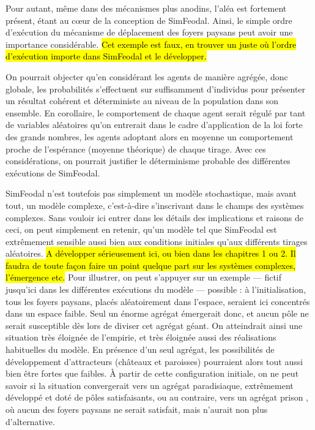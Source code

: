 	Pour autant, même dans des mécanismes plus anodins, l'aléa est fortement présent, étant au cœur de la conception de SimFeodal.
	Ainsi, le simple ordre d’exécution du mécanisme de déplacement des foyers paysans peut avoir une importance considérable.
	\hl{Cet exemple est faux, en trouver un juste où l'ordre d’exécution importe dans SimFeodal et le développer.}

	On pourrait objecter qu'en considérant les agents de manière agrégée, donc globale, les probabilités s'effectuent sur suffisamment d'individus pour présenter un résultat cohérent et déterministe au niveau de la population dans son ensemble.
	En corollaire, le comportement de chaque agent serait régulé par tant de variables aléatoires qu'on entrerait dans le cadre d'application de la loi forte des grands nombres, les agents adoptant alors en moyenne un comportement proche de l’espérance (moyenne théorique) de chaque tirage.
	Avec ces considérations, on pourrait justifier le déterminisme probable des différentes exécutions de SimFeodal.

	SimFeodal n'est toutefois pas simplement un modèle stochastique, mais avant tout, un modèle complexe, c'est-à-dire s'inscrivant dans le champs des systèmes complexes. Sans vouloir ici entrer dans les détails des implications et raisons de ceci, on peut simplement en retenir, qu'un modèle tel que SimFeodal est extrêmement sensible aussi bien aux conditions initiales qu'aux différents tirages aléatoires.
	\hl{A développer sérieusement ici, ou bien dans les chapitres 1 ou 2. Il faudra de toute façon faire un point quelque part sur les systèmes complexes, l'émergence etc.}
	Pour illustrer, on peut s'appuyer sur un exemple ---
	fictif jusqu'ici dans les différentes exécutions du modèle
	--- possible : à l'initialisation, tous les foyers paysans, placés aléatoirement dans l'espace, seraient ici concentrés dans un espace faible.
	Seul un énorme agrégat émergerait donc, et aucun pôle ne serait susceptible dès lors de diviser cet agrégat géant.
	On atteindrait ainsi une situation très éloignée de l'empirie, et très éloignée aussi des réalisations habituelles du modèle.
	En présence d'un seul agrégat, les possibilités de développement d'attracteurs (châteaux et paroisses) pourraient alors tout aussi bien être fortes que faibles.
	À partir de cette configuration initiale, on ne peut savoir si la situation convergerait vers un agrégat \og paradisiaque\fg{}, extrêmement développé et doté de pôles satisfaisants, ou au contraire, vers un agrégat \og prison \fg{}, où aucun des foyers paysans ne serait satisfait, mais n'aurait non plus d'alternative.

